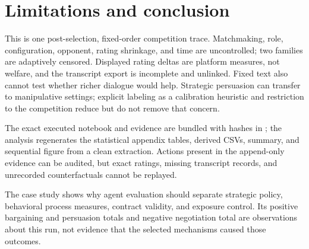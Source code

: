 \section{Limitations and conclusion}

This is one post-selection, fixed-order competition trace. Matchmaking, role,
configuration, opponent, rating shrinkage, and time are uncontrolled; two
families are adaptively censored. Displayed rating deltas are platform measures,
not welfare, and the transcript export is incomplete and unlinked. Fixed text
also cannot test whether richer dialogue would help. Strategic persuasion can
transfer to manipulative settings; explicit labeling as a calibration heuristic
and restriction to the competition reduce but do not remove that concern.

The exact executed notebook and evidence are bundled with hashes in
; the analysis regenerates the statistical appendix tables,
derived CSVs, summary, and sequential figure from a clean extraction. Actions
present in the append-only evidence can be audited,
but exact ratings, missing transcript records, and unrecorded counterfactuals
cannot be replayed.

The case study shows why agent evaluation should separate strategic policy,
behavioral process measures, contract validity, and exposure control. Its
positive bargaining and persuasion totals and negative negotiation total are
observations about this run, not evidence that the selected mechanisms caused
those outcomes.

